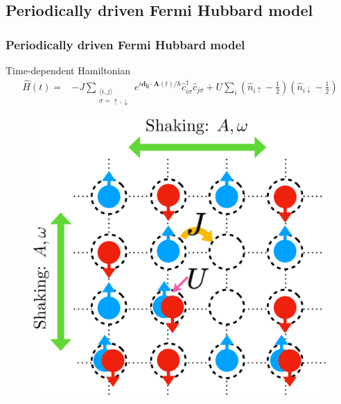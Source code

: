 \documentclass[]{beamer}
\begin{document}
\subsection{Periodically driven Fermi Hubbard model}
\begin{frame}\frametitle{Periodically driven Fermi Hubbard model}
\pause
\begin{block}{Time-dependent Hamiltonian}
\begin{align*} %
    \hat{H}(t) =& -J \sum_{\substack{\langle i,j\rangle \\ 
    \sigma = \uparrow,\downarrow}} e^{i\mathbf{d_{ij}}\cdot \mathbf{A}(t)/\hbar}
    \hat{c}_{i\sigma}^{\dagger}\hat{c}_{j\sigma}
    +U\sum_{i}\left(\hat{n}_{i\uparrow}-\frac{1}{2}\right)
    \left(\hat{n}_{i\downarrow}-\frac{1}{2}\right)
\end{align*}
\end{block}
\begin{block}{}
\begin{figure}[!htb]
    \centering
    \includegraphics[width=0.4\columnwidth]{figs/schematic.pdf}
\end{figure}
\end{block}
\end{frame}
\end{document}
